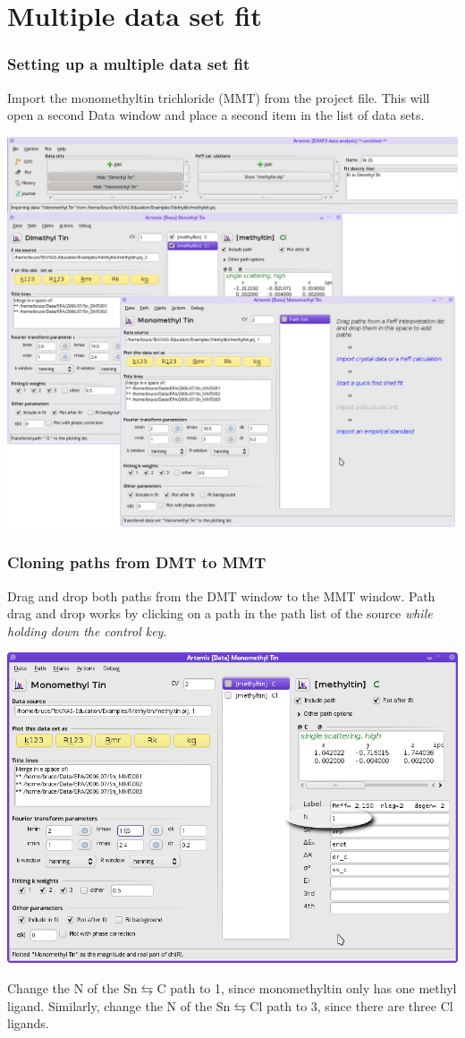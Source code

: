 \documentclass[10pt, xcolor=x11names, compress, handout]{beamer}
\begin{document}
\section{Multiple data set fit}


\begin{frame}
  \frametitle{Setting up a multiple data set fit}
  Import the monomethyltin trichloride (MMT) from the {\athena}
  project file.  This will open a second Data window and place a
  second item in the list of data sets.
  \begin{center}
    \includegraphics[width=0.7\linewidth]{images/mds.png}
  \end{center}
\end{frame}

\begin{frame}
  \frametitle{Cloning paths from DMT to MMT}
  \small
  Drag and drop both paths from the DMT window to the MMT window.
  Path drag and drop works by clicking on a path in the path list of
  the source \textit{while holding down the control key}.

  \begin{center}
    \includegraphics[width=0.65\linewidth]{images/MMT.png}
  \end{center}
  
  Change the N of the Sn$\leftrightarrows$C path to 1, since
  monomethyltin only has one methyl ligand.  Similarly, change the N
  of the Sn$\leftrightarrows$Cl path to 3, since there are three Cl ligands.
\end{frame}
\end{document}
